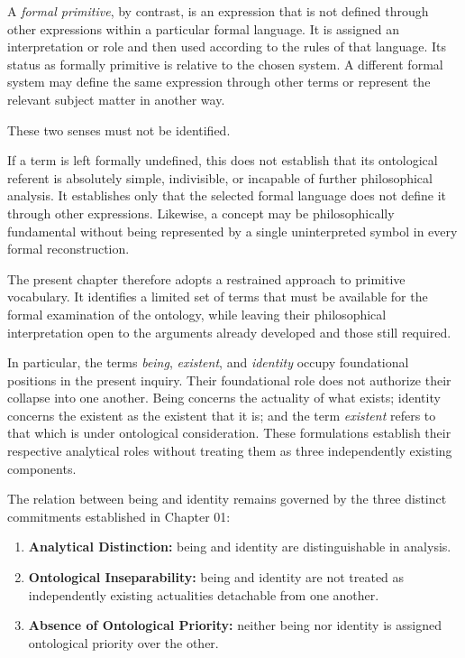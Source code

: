 A \emph{formal primitive}, by contrast, is an expression
that is not defined through other expressions within
a particular formal language. It is assigned an
interpretation or role and then used according to the
rules of that language. Its status as formally primitive
is relative to the chosen system. A different formal
system may define the same expression through other
terms or represent the relevant subject matter in
another way.

These two senses must not be identified.

If a term is left formally undefined, this does not
establish that its ontological referent is absolutely
simple, indivisible, or incapable of further philosophical
analysis. It establishes only that the selected formal
language does not define it through other expressions.
Likewise, a concept may be philosophically fundamental
without being represented by a single uninterpreted
symbol in every formal reconstruction.

The present chapter therefore adopts a restrained
approach to primitive vocabulary. It identifies a
limited set of terms that must be available for the
formal examination of the ontology, while leaving
their philosophical interpretation open to the
arguments already developed and those still required.

In particular, the terms \emph{being}, \emph{existent},
and \emph{identity} occupy foundational positions
in the present inquiry. Their foundational role
does not authorize their collapse into one another.
Being concerns the actuality of what exists; identity
concerns the existent as the existent that it is;
and the term \emph{existent} refers to that which
is under ontological consideration. These formulations
establish their respective analytical roles without
treating them as three independently existing
components.

The relation between being and identity remains
governed by the three distinct commitments established
in Chapter 01:

\begin{enumerate}
    \item \textbf{Analytical Distinction:} being and
    identity are distinguishable in analysis.

    \item \textbf{Ontological Inseparability:} being
    and identity are not treated as independently
    existing actualities detachable from one another.

    \item \textbf{Absence of Ontological Priority:}
    neither being nor identity is assigned ontological
    priority over the other.
\end{enumerate}

